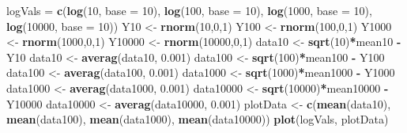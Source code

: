 \documentclass[
]{article}
\newenvironment{Shaded}{\begin{snugshade}}{\end{snugshade}}
\newcommand{\DataTypeTok}[1]{\textcolor[rgb]{0.13,0.29,0.53}{#1}}
\newcommand{\DecValTok}[1]{\textcolor[rgb]{0.00,0.00,0.81}{#1}}
\newcommand{\FloatTok}[1]{\textcolor[rgb]{0.00,0.00,0.81}{#1}}
\newcommand{\KeywordTok}[1]{\textcolor[rgb]{0.13,0.29,0.53}{\textbf{#1}}}
\newcommand{\NormalTok}[1]{#1}
\newcommand{\OperatorTok}[1]{\textcolor[rgb]{0.81,0.36,0.00}{\textbf{#1}}}
\newcommand{\StringTok}[1]{\textcolor[rgb]{0.31,0.60,0.02}{#1}}
\begin{document}
\begin{Shaded}
\begin{Highlighting}[]
\NormalTok{logVals =}\StringTok{ }\KeywordTok{c}\NormalTok{(}\KeywordTok{log}\NormalTok{(}\DecValTok{10}\NormalTok{, }\DataTypeTok{base =} \DecValTok{10}\NormalTok{), }\KeywordTok{log}\NormalTok{(}\DecValTok{100}\NormalTok{, }\DataTypeTok{base =} \DecValTok{10}\NormalTok{), }\KeywordTok{log}\NormalTok{(}\DecValTok{1000}\NormalTok{, }\DataTypeTok{base =} \DecValTok{10}\NormalTok{), }\KeywordTok{log}\NormalTok{(}\DecValTok{10000}\NormalTok{, }\DataTypeTok{base =} \DecValTok{10}\NormalTok{))}
\NormalTok{Y10 <-}\StringTok{ }\KeywordTok{rnorm}\NormalTok{(}\DecValTok{10}\NormalTok{,}\DecValTok{0}\NormalTok{,}\DecValTok{1}\NormalTok{)}
\NormalTok{Y100 <-}\StringTok{ }\KeywordTok{rnorm}\NormalTok{(}\DecValTok{100}\NormalTok{,}\DecValTok{0}\NormalTok{,}\DecValTok{1}\NormalTok{)}
\NormalTok{Y1000 <-}\StringTok{ }\KeywordTok{rnorm}\NormalTok{(}\DecValTok{1000}\NormalTok{,}\DecValTok{0}\NormalTok{,}\DecValTok{1}\NormalTok{)}
\NormalTok{Y10000 <-}\StringTok{ }\KeywordTok{rnorm}\NormalTok{(}\DecValTok{10000}\NormalTok{,}\DecValTok{0}\NormalTok{,}\DecValTok{1}\NormalTok{)}
\NormalTok{data10 <-}\StringTok{ }\KeywordTok{sqrt}\NormalTok{(}\DecValTok{10}\NormalTok{)}\OperatorTok{*}\NormalTok{mean10 }\OperatorTok{-}\StringTok{ }\NormalTok{Y10}
\NormalTok{data10 <-}\StringTok{ }\KeywordTok{averag}\NormalTok{(data10, }\FloatTok{0.001}\NormalTok{)}
\NormalTok{data100 <-}\StringTok{ }\KeywordTok{sqrt}\NormalTok{(}\DecValTok{100}\NormalTok{)}\OperatorTok{*}\NormalTok{mean100 }\OperatorTok{-}\StringTok{ }\NormalTok{Y100}
\NormalTok{data100 <-}\StringTok{ }\KeywordTok{averag}\NormalTok{(data100, }\FloatTok{0.001}\NormalTok{)}
\NormalTok{data1000 <-}\StringTok{ }\KeywordTok{sqrt}\NormalTok{(}\DecValTok{1000}\NormalTok{)}\OperatorTok{*}\NormalTok{mean1000 }\OperatorTok{-}\StringTok{ }\NormalTok{Y1000}
\NormalTok{data1000 <-}\StringTok{ }\KeywordTok{averag}\NormalTok{(data1000, }\FloatTok{0.001}\NormalTok{)}
\NormalTok{data10000 <-}\StringTok{ }\KeywordTok{sqrt}\NormalTok{(}\DecValTok{10000}\NormalTok{)}\OperatorTok{*}\NormalTok{mean10000 }\OperatorTok{-}\StringTok{ }\NormalTok{Y10000}
\NormalTok{data10000 <-}\StringTok{ }\KeywordTok{averag}\NormalTok{(data10000, }\FloatTok{0.001}\NormalTok{)}
\NormalTok{plotData <-}\StringTok{ }\KeywordTok{c}\NormalTok{(}\KeywordTok{mean}\NormalTok{(data10), }\KeywordTok{mean}\NormalTok{(data100), }\KeywordTok{mean}\NormalTok{(data1000), }\KeywordTok{mean}\NormalTok{(data10000))}
\KeywordTok{plot}\NormalTok{(logVals, plotData)}
\end{Highlighting}
\end{Shaded}
\end{document}
